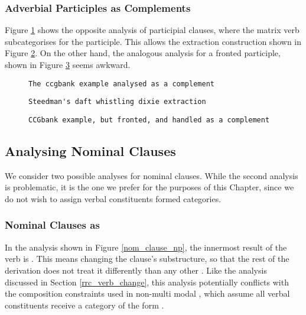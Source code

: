 \subsubsection{Adverbial Participles as Complements}

Figure \ref{adverbial_complement} shows the opposite analysis of participial clauses, where the matrix verb subcategorises for the participle. This allows the extraction construction shown in Figure \ref{adverbial_complement_extraction}. On the other hand, the analogous analysis for a fronted participle, shown in Figure \ref{fronted_participle_complement} seems awkward.

\begin{figure}
 \begin{verbatim}
The ccgbank example analysed as a complement
 \end{verbatim}
\label{adverbial_complement}
\end{figure}

\begin{figure}
 \begin{verbatim}
Steedman's daft whistling dixie extraction
 \end{verbatim}
\label{adverbial_complement_extraction}
\end{figure}

\begin{figure}
 \begin{verbatim}
CCGbank example, but fronted, and handled as a complement
 \end{verbatim}
\label{fronted_participle_complement}
\end{figure}


\subsection{Analysing Nominal Clauses}

We consider two possible analyses for nominal clauses. While the second analysis is problematic, it is the one we prefer for the purposes of this Chapter, since we do not wish to assign verbal constituents  formed categories.

\subsubsection{Nominal Clauses as }

In the analysis shown in Figure \ref{nom_clause_np}, the innermost result of the verb is . This means changing the clause's substructure, so that the rest of the derivation does not treat it differently than any other . Like the analysis discussed in Section \ref{rrc_verb_change}, this analysis potentially conflicts with the composition constraints used in non-multi modal \ccg, which assume all verbal constituents receive a category of the form .

